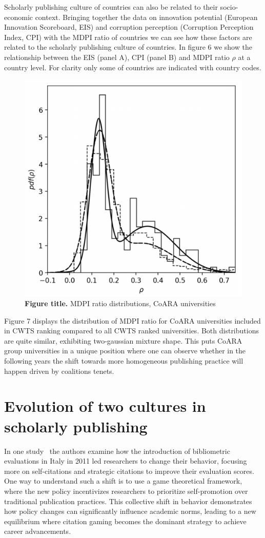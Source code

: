 \documentclass[amsfonts, amssymb, prl, superscriptaddress, notitlepage, twocolumn, nofootinbib]{revtex4-2}
\begin{document}
Scholarly publishing culture of countries can also be related to their socio-economic context. Bringing together the data on innovation potential (European Innovation Scoreboard, EIS) and corruption perception (Corruption Perception Index, CPI) with the MDPI ratio of countries we can see how these factors are related to the scholarly publishing culture of countries. In figure 6 we show the relationship between the EIS (panel A), CPI (panel B) and MDPI ratio $\rho$ at a country level. For clarity only some of countries are indicated with country codes.

\begin{figure}
    \centering
    \includegraphics[width=.6\linewidth]{Fig05f.png}
    \caption{\label{fig:fig7} {\bf Figure title.} MDPI ratio distributions, CoARA universities  
}
\end{figure}

Figure 7 displays the distribution of MDPI ratio for CoARA universities included in CWTS ranking compared to all CWTS ranked universities. Both distributions are quite similar, exhibiting two-gaussian mixture shape. This puts CoARA group universities in a unique position where one can observe whether in the following years the shift towards more homogeneous publishing practice will happen driven by coalitions tenets.   

\section{Evolution of two cultures in scholarly publishing }
In one study~\cite{baccini2019citation} the authors examine how the introduction of bibliometric evaluations in Italy in 2011 led researchers to change their behavior, focusing more on self-citations and strategic citations to improve their evaluation scores. One way to understand such a shift is to use a game theoretical framework, where the new policy incentivizes researchers to prioritize self-promotion over traditional publication practices. This collective shift in behavior demonstrates how policy changes can significantly influence academic norms, leading to a new equilibrium where citation gaming becomes the dominant strategy to achieve career advancements. 
\end{document}
